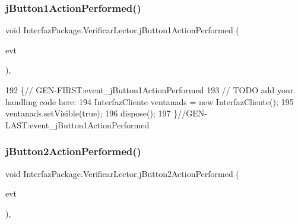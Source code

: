 \mbox{\label{class_interfaz_package_1_1_verificar_lector_ab1cf48292f59166c5e4b0e9a45202b48}} 
\subsubsection{\texorpdfstring{j\+Button1\+Action\+Performed()}{jButton1ActionPerformed()}}
{\footnotesize\ttfamily void Interfaz\+Package.\+Verificar\+Lector.\+j\+Button1\+Action\+Performed (\begin{DoxyParamCaption}\item[{java.\+awt.\+event.\+Action\+Event}]{evt }\end{DoxyParamCaption})\hspace{0.3cm}{\ttfamily [inline]}, {\ttfamily [private]}}


\begin{DoxyCode}
192                                                                          \{\textcolor{comment}{//
      GEN-FIRST:event\_jButton1ActionPerformed}
193         \textcolor{comment}{// TODO add your handling code here:}
194         InterfazCliente ventanads = \textcolor{keyword}{new} InterfazCliente();
195         ventanads.setVisible(\textcolor{keyword}{true});
196         dispose();
197     \}\textcolor{comment}{//GEN-LAST:event\_jButton1ActionPerformed}
\end{DoxyCode}
\mbox{\label{class_interfaz_package_1_1_verificar_lector_ac3ea56de497dffbeb0168dcf600f6583}} 
\subsubsection{\texorpdfstring{j\+Button2\+Action\+Performed()}{jButton2ActionPerformed()}}
{\footnotesize\ttfamily void Interfaz\+Package.\+Verificar\+Lector.\+j\+Button2\+Action\+Performed (\begin{DoxyParamCaption}\item[{java.\+awt.\+event.\+Action\+Event}]{evt }\end{DoxyParamCaption})\hspace{0.3cm}{\ttfamily [inline]}, {\ttfamily [private]}}


